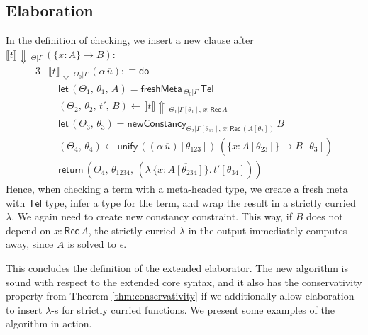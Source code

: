 \documentclass[acmsmall,review,anonymous,prologue,dvipsnames]{acmart}\settopmatter{printfolios=true,printccs=false,printacmref=false}
\newcommand{\slet}{\boldsymbol{\mathsf{let}}}
\newcommand{\freshMeta}[3]{\mathsf{freshMeta}\,_{#1|#2}\,#3}
\newcommand{\newConstancy}[5]{\mathsf{newConstancy}_{#1|#2,\,#3 : \Rec\,#4}\,#5}
\newcommand{\unify}{\mathsf{unify}}
\newcommand{\echeck}[4]{\llbracket#1\rrbracket\!\Downarrow\,_{#2|#3}\,#4}
\newcommand{\einfer}[3]{\llbracket#1\rrbracket\!\Uparrow\,_{#2|#3}}
\newcommand{\edo}{\boldsymbol{\mathsf{do}}}
\newcommand{\ereturn}{\boldsymbol{\mathsf{return}}}
\newcommand{\Tel}{\mathsf{Tel}}
\newcommand{\Rec}{\mathsf{Rec}}
\newcommand{\ol}[1]{\overline{#1}}
\theoremstyle{remark}
\begin{document}
\subsection{Elaboration}

In the definition of checking, we insert a new clause after
$\echeck{t}{\Theta}{\Gamma}{(\{x : A\}\to B)}$:
\begin{alignat*}{3}
& \echeck{t}{\Theta_0}{\Gamma}{(\alpha\,\ol{u})} :\equiv \edo\\
& \quad \slet\,(\Theta_1,\,\theta_1,\,A) = \freshMeta{\Theta_0}{\Gamma}{\Tel}\\
& \quad (\Theta_2,\,\theta_2,\,t',\,B) \leftarrow \einfer{t}{\Theta_1}{\Gamma[\theta_1],\,x:\Rec\,A}\\
& \quad \slet\,(\Theta_3,\,\theta_3) = \newConstancy{\Theta_2}{\Gamma[\theta_{12}]}{x}{(A[\theta_2])}{B}\\
& \quad (\Theta_4,\,\theta_4) \leftarrow
            \unify\, ((\alpha\,\ol{u})[\theta_{123}])\,(\{x : \ol{A[\theta_{23}]}\} \to B[\theta_3])\\
& \quad \ereturn\,(\Theta_4,\,\theta_{1234},\,(\lambda\,\{x : \ol{A[\theta_{234}]}\}.\,t'[\theta_{34}]))
\end{alignat*}
Hence, when checking a term with a meta-headed type, we create a fresh meta with
$\Tel$ type, infer a type for the term, and wrap the result in a strictly
curried $\lambda$. We again need to create new constancy constraint. This way,
if $B$ does not depend on $x : \Rec\,A$, the strictly curried $\lambda$ in the
output immediately computes away, since $A$ is solved to $\epsilon$.

This concludes the definition of the extended elaborator. The new algorithm is
sound with respect to the extended core syntax, and it also has the
conservativity property from Theorem \ref{thm:conservativity} if we additionally
allow elaboration to insert $\lambda$-s for strictly curried functions. We present
some examples of the algorithm in action.
\end{document}
